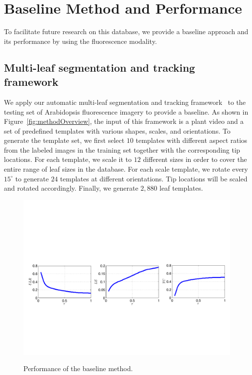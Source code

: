 \section{Baseline Method and Performance}
\label{sec:baseline}

To facilitate future research on this database, we provide a baseline approach and its performance by using the fluorescence modality. 

\subsection{Multi-leaf segmentation and tracking framework}
We apply our automatic multi-leaf segmentation and tracking framework~\cite{yin2014a,yin2014b} to the testing set of Arabidopsis fluorescence imagery to provide a baseline.
As shown in Figure~\ref{fig:methodOverview}, the input of this framework is a plant video and a set of predefined templates with various shapes, scales, and orientations.
To generate the template set, we first select $10$ templates with different aspect ratios from the labeled images in the training set together with the corresponding tip locations.
For each template, we scale it to $12$ different sizes in order to cover the entire range of leaf sizes in the database.
For each scale template, we rotate every $15^{\circ}$ to generate $24$ templates at different orientations.
Tip locations will be scaled and rotated accordingly.
Finally, we generate $2,880$ leaf templates.

\begin{figure}
\centering
\includegraphics[width=.98\textwidth]{Figures/performance}\\
\caption{Performance of the baseline method.}
\label{fig:performance}
\end{figure}

